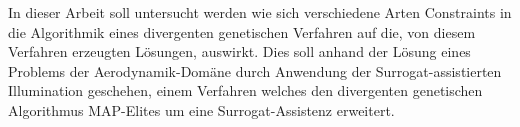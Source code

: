 In dieser Arbeit soll untersucht werden wie sich verschiedene Arten Constraints in die Algorithmik eines divergenten genetischen Verfahren auf die, von diesem Verfahren erzeugten Lösungen, auswirkt.
Dies soll anhand der Lösung eines Problems der Aerodynamik-Domäne durch Anwendung der Surrogat-assistierten Illumination geschehen, einem Verfahren welches den divergenten genetischen Algorithmus MAP-Elites um eine Surrogat-Assistenz erweitert.

% 
%

